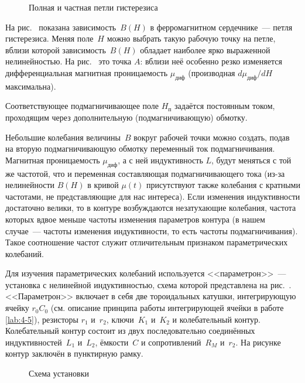 \begin{figure}[h!]
    \centering
    \caption{Полная и частная петли гистерезиса}
\end{figure}

На рис.~ показана зависимость~$B(H)$ в ферромагнитном
сердечнике~--- петля гистерезиса. Меняя поле~$H$ можно выбрать такую рабочую
точку на петле, вблизи которой зависимость~$B(H)$ обладает наиболее ярко
выраженной нелинейностью. На рис.~ это точка $A$:
вблизи неё особенно резко изменяется дифференциальная магнитная
проницаемость $\mu_\text{диф}$ (производная
$d\mu_\text{диф}/dH$ максимальна).

Соответствующее подмагничивающее поле $H_\text{п}$ задаётся постоянным током,
проходящим через дополнительную (подмагничивающую) обмотку.

Небольшие колебания величины~$B$ вокруг рабочей точки можно создать, подав на
вторую подмагничивающую обмотку переменный ток подмагничивания. Магнитная
проницаемость $\mu_\text{диф}$, а с ней индуктивность $L$, будут меняться с той
же частотой, что и переменная составляющая подмагничивающего тока (из-за
нелинейности $B(H)$ в кривой $\mu(t)$ присутствуют также колебания с кратными
частотами, не представляющие для нас интереса). Если изменения индуктивности
достаточно велики, то в контуре возбуждаются незатухающие колебания, частота
которых вдвое меньше частоты изменения параметров контура (в нашем случае~---
частоты изменения индуктивности, то есть частоты подмагничивания). Такое
соотношение частот служит отличительным признаком параметрических колебаний.

\experiment
Для изучения параметрических колебаний используется <<параметрон>>~--- установка
с нелинейной индуктивностью, схема которой представлена на
рис.~. <<Параметрон>> включает в себя две
тороидальных катушки, интегрирующую ячейку $r_0C_0$ (см. описание
принципа работы интегрирующей ячейки в работе \ref{lab:4-5}),
резисторы $r_1$ и~$r_2$, ключи~$K_1$ и~$K_2$ и колебательный контур.
Колебательный контур состоит из двух последовательно соединённых
индуктивностей~$L_1$ и~$L_2$, ёмкости~$C$ и сопротивлений~$R_M$ и~$r_2$.
На рисунке контур заключён в пунктирную рамку.
\begin{figure}[h!]
\centering
	\caption{Схема установки}
\end{figure}

